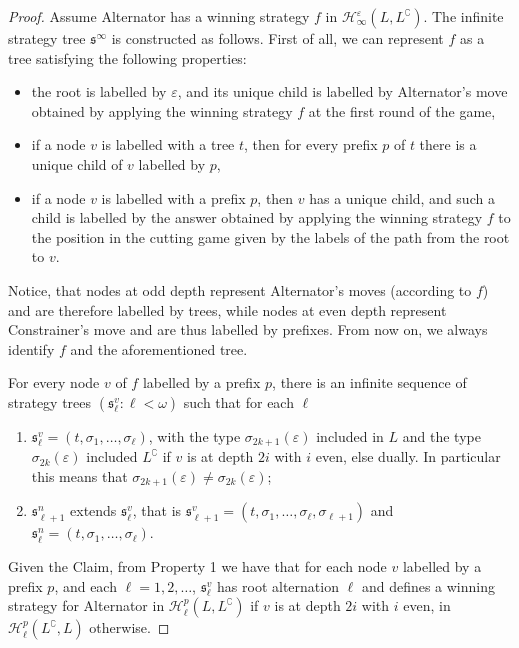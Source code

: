  \begin{proof} 
 Assume Alternator has a winning strategy $f$ in  $\mathcal{H}^\varepsilon_\infty(L, L^\complement)$. The infinite strategy tree $\mathfrak{s}^\infty$ is constructed as follows. First of all, we can represent $f$ as a tree satisfying the following properties:
\begin{itemize}
\item the root is labelled by $\varepsilon$, and its unique child is labelled by Alternator's move obtained by applying the winning strategy $f$ at the first round of the game,
\item if a node $v$ is labelled with a tree $t$, then for every prefix $p$ of $t$ there is a unique child of $v$ labelled by $p$,
\item if a node $v$ is labelled with a prefix $p$, then $v$ has a unique child, and such a child is labelled by the answer obtained by applying the winning strategy $f$ to the position in the cutting game given by the labels of the path from the root to $v$.
\end{itemize}
Notice, that nodes at odd depth represent Alternator's moves (according to $f$) and are therefore labelled by trees, while nodes at even depth represent Constrainer's move and are thus labelled by prefixes. From now on, we always identify $f$ and the aforementioned tree.
\begin{claim}\label{claim:strategy}
For every node $v$ of $f$ labelled by a prefix $p$, 
there is an infinite sequence of strategy trees $(\mathfrak{s}^v_\ell: \ell < \omega)$ such that for each $\ell$
\begin{enumerate}
\item $\mathfrak{s}^v_\ell=(t, \sigma_1, \dots, \sigma_\ell)$, with the type $\sigma_{2k+1}(\varepsilon)$ included in $L$ and the type  $\sigma_{2k}(\varepsilon)$ included  $L^\complement$ if $v$ is at depth $2i$ with $i$ even, else dually. In particular this means that  $\sigma_{2k+1}(\varepsilon) \neq \sigma_{2k}(\varepsilon)$;
\item $\mathfrak{s}^n_{\ell+1}$ extends $\mathfrak{s}^v_\ell$, that is  $\mathfrak{s}^v_{\ell+1}=(t, \sigma_1, \dots, \sigma_\ell, \sigma_{\ell+1})$ and $\mathfrak{s}^n_\ell=(t, \sigma_1, \dots, \sigma_\ell)$.
\end{enumerate}
\end{claim}
Given the Claim, from Property 1 we have that
for each node $v$ labelled by a prefix $p$, and each $\ell=1,2,\dots$, $\mathfrak{s}^v_\ell$ has root alternation $\ell$ and defines a winning strategy for Alternator in $\mathcal{H}^p_\ell(L, L^\complement)$ if $v$ is at depth $2i$ with $i$ even, in $\mathcal{H}^p_\ell(L^\complement, L)$ otherwise. 

\end{proof}
